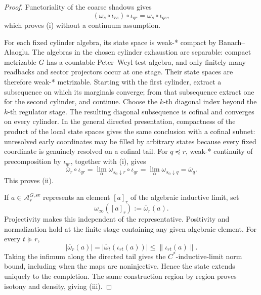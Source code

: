 \begin{proof}
Functoriality of the coarse shadows gives
\[
(\omega_s\circ\iota_{rs})\circ\iota_{qr}
=\omega_s\circ\iota_{qs},
\]
which proves \textup{(i)} without a continuum assumption.

For each fixed cylinder algebra, its state space is weak-* compact by Banach--Alaoglu. The
algebras in the chosen cylinder exhaustion are separable: compact metrizable \(G\) has a
countable Peter--Weyl test algebra, and only finitely many readbacks and sector projectors occur at
one stage. Their state spaces are therefore weak-* metrizable. Starting with the first cylinder,
extract a subsequence on which its marginals converge; from that subsequence extract one
for the second cylinder, and continue. Choose the \(k\)-th diagonal index beyond the \(k\)-th
regulator stage. The resulting diagonal subsequence is cofinal and converges on every cylinder. In
the general directed presentation, compactness of the product of the local state spaces gives the
same conclusion with a cofinal subnet: unresolved early coordinates may be filled by arbitrary
states because every fixed coordinate is genuinely resolved on a cofinal tail. For
\(q\preceq r\), weak-* continuity of precomposition
by \(\iota_{qr}\), together with \textup{(i)}, gives
\[
\overline\omega_r\circ\iota_{qr}
=\lim_\alpha\omega_{s_\alpha\downarrow r}\circ\iota_{qr}
=\lim_\alpha\omega_{s_\alpha\downarrow q}
=\overline\omega_q.
\]
This proves \textup{(ii)}.

If \(a\in\mathcal A_r^{G,\mathrm{sv}}\) represents an element \([a]_r\) of the algebraic
inductive limit, set
\[
\omega_\infty([a]_r):=\overline\omega_r(a).
\]
Projectivity makes this independent of the representative. Positivity and normalization hold at
the finite stage containing any given algebraic element. For every \(t\succeq r\),
\[
|\overline\omega_r(a)|
=|\overline\omega_t(\iota_{rt}(a))|
\le\|\iota_{rt}(a)\|.
\]
Taking the infimum along the directed tail gives the \(C^*\)-inductive-limit norm bound, including
when the maps are noninjective. Hence the state extends uniquely to the completion. The
same construction region by region proves isotony and density, giving \textup{(iii)}.


\end{proof}
